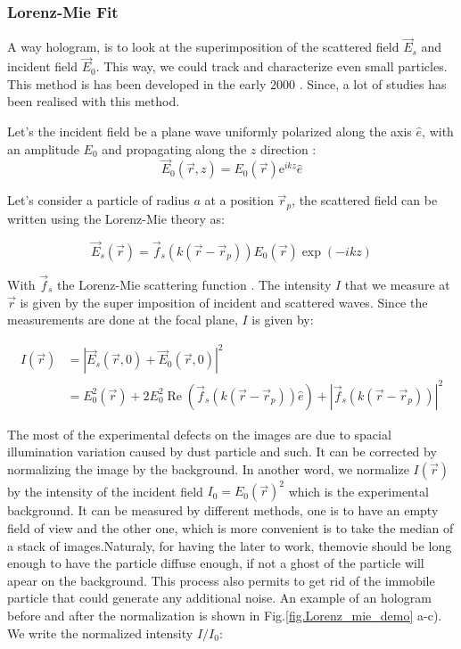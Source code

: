 \subsubsection{Lorenz-Mie Fit}


A way hologram, is to look at the superimposition of the scattered field $\vec{E}_s$ and incident field $\vec{E}_0$. This way, we could track and characterize even small particles. This method is has been developed in the early 2000 \cite{ovryn_imaging_2000, lee_characterizing_2007}. Since, a lot of studies has been realised with this method. 

Let's the incident field be a plane wave uniformly polarized along the axis $ \hat{e}$, with an amplitude $E_0$ and propagating along the $z$ direction :
\begin{equation}
	\vec{E}_0(\vec{r},z) = E_0(\vec{r}) \mathrm{e}^{ikz}\hat{e}
\end{equation}

Let's consider a particle of radius $a$ at a position $\vec{r}_p $, the scattered field can be written using the Lorenz-Mie theory \cite{f_bohren_absorption_1998} as:

\begin{equation}
	\vec{E}_s(\vec{r}) =  \vec{f}_s(k(\vec{r} - \vec{r}_p))E_0(\vec{r}) \exp \left(-ikz\right) 
\end{equation} 

With $\vec{f}_s$ the Lorenz-Mie scattering function \cite{f_bohren_absorption_1998}. The intensity $I$ that we measure at $\vec{r}$ is given by the super imposition of incident and scattered waves. Since the measurements are done at the focal plane, $I$ is given by:

\begin{equation}
	\begin{aligned}
	I(\vec{r}) & = |\vec{E}_s(\vec{r}, 0) + \vec{E}_0(\vec{r}, 0)|^2 \\
	& = E_0^2(\vec{r}) + 2 E_0^2\operatorname{Re} \left(\vec{f}_s(k(\vec{r}- \vec{r}_p)) \hat{e}\right) + | \vec{f}_s(k(\vec{r}- \vec{r}_p)) |^2
	\end{aligned}
\end{equation}

The most of the experimental defects on the images are due to spacial illumination variation caused by dust particle and such. It can be corrected by normalizing the image by the background. In another word, we normalize  $I(\vec{r})$ by the intensity of the incident field $I_0 = E_0(\vec{r})^2$ which is the experimental background. It can be measured by different methods, one is to have an empty field of view and the other one, which is more convenient is to take the median of a stack of images.Naturaly, for having the later to work, themovie should be long enough to have the particle diffuse enough, if not a ghost of the particle will apear on the background. This process also permits to get rid of the immobile particle that could generate any additional noise. An example of an hologram before and after the normalization is shown in Fig.\ref{fig.Lorenz_mie_demo} a-c). We write the normalized intensity $I/I_0$:

